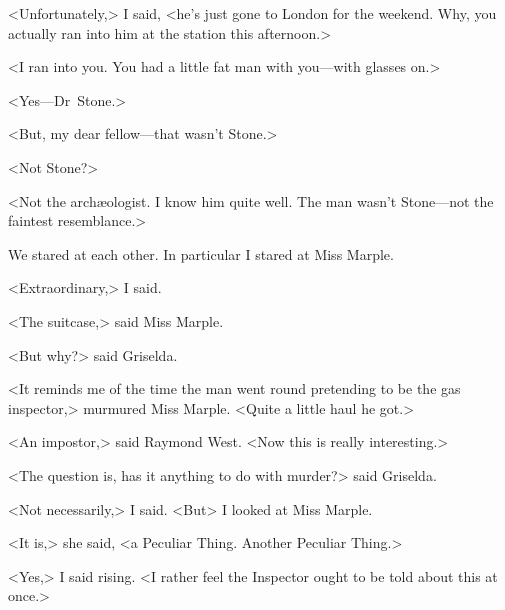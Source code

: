 <Unfortunately,> I said, <he's just gone to London for the weekend. Why, you actually ran into him at the station this afternoon.>

<I ran into you. You had a little fat man with you—with glasses on.>

<Yes—Dr~Stone.>

<But, my dear fellow—that wasn't Stone.>

<Not Stone?>

<Not the archæologist. I know him quite well. The man wasn't Stone—not the faintest resemblance.>

We stared at each other. In particular I stared at Miss Marple.

<Extraordinary,> I said.

<The suitcase,> said Miss Marple.

<But why?> said Griselda.

<It reminds me of the time the man went round pretending to be the gas inspector,> murmured Miss Marple. <Quite a little haul he got.>

<An impostor,> said Raymond West. <Now this is really interesting.>

<The question is, has it anything to do with murder?> said Griselda.

<Not necessarily,> I said. <But\longdash> I looked at Miss Marple.

<It is,> she said, <a Peculiar Thing. Another Peculiar Thing.>

<Yes,> I said rising. <I rather feel the Inspector ought to be told about this at once.>